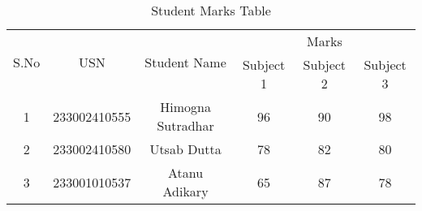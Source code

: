 \documentclass{article}
\begin{document}
\begin{table}[h!]
\centering
\begin{tabular}{|c|c|c|c|c|c|}
\hline
\multirow{2}{*}{S.No} & \multirow{2}{*}{USN} & \multirow{2}{*}{Student Name} & \multicolumn{3}{c|}{Marks} \\ \cline{4-6} 
                      &                      &                               & Subject 1 & Subject 2 & Subject 3 \\ \hline
1                     & 233002410555                & Himogna Sutradhar                      & 96        & 90        & 98        \\ \hline
2                     & 233002410580                & Utsab Dutta                    & 78        & 82        & 80        \\ \hline
3                     & 233001010537                & Atanu Adikary                 & 65        & 87        & 78        \\ \hline
\end{tabular}
\caption{Student Marks Table}
\label{tab:student_marks}
\end{table}
\end{document}
